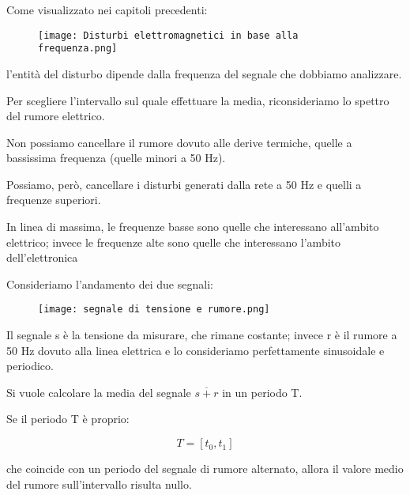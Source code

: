 Come visualizzato nei capitoli precedenti:  

\begin{figure}[h]
    \centering
    \texttt{[image: Disturbi elettromagnetici in base alla frequenza.png]}
\end{figure}

l'entità del disturbo dipende dalla frequenza del segnale che dobbiamo analizzare. \newline 

Per scegliere l'intervallo sul quale effettuare la media, riconsideriamo lo spettro del rumore elettrico. \newline 

Non possiamo cancellare il rumore dovuto alle derive termiche, quelle a bassissima frequenza (quelle minori a 50 Hz). \newline 

Possiamo, però, cancellare i disturbi generati dalla rete a 50 Hz e quelli a frequenze superiori. \newline 

\begin{tcolorbox}
    In linea di massima, le frequenze basse sono quelle che interessano all'ambito elettrico; 
    invece le frequenze alte sono quelle che interessano l'ambito dell'elettronica
\end{tcolorbox}

Consideriamo l'andamento dei due segnali: 

\begin{figure}[h]
    \centering
    \texttt{[image: segnale di tensione e rumore.png]}
\end{figure}

Il segnale s è la tensione da misurare, che rimane costante; 
invece r è il rumore a 50 Hz dovuto alla linea elettrica e lo consideriamo perfettamente sinusoidale e periodico. \newline  

Si vuole calcolare la media del segnale $\overline{s + r}$ in un periodo T. \newline 

Se il periodo T è proprio: 

{
    \Large 
    \begin{equation}
        T = [t_0, t_1]
    \end{equation}
}

che coincide con un periodo del segnale di rumore alternato, 
allora il valore medio del rumore sull'intervallo risulta nullo. \newline 

